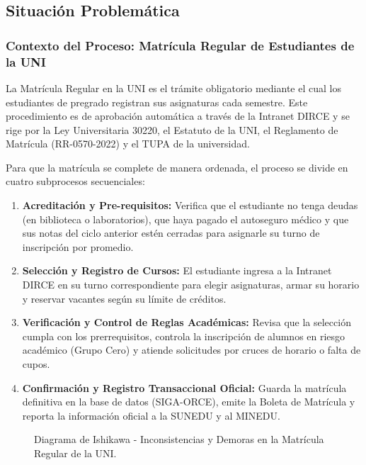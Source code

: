 \subsection{Situación Problemática}

\subsubsection{Contexto del Proceso: Matrícula Regular de Estudiantes de la UNI}
La Matrícula Regular en la UNI es el trámite obligatorio mediante el cual los estudiantes de pregrado registran sus asignaturas cada semestre. Este procedimiento es de aprobación automática a través de la Intranet DIRCE y se rige por la Ley Universitaria 30220, el Estatuto de la UNI, el Reglamento de Matrícula (RR-0570-2022) y el TUPA de la universidad.

Para que la matrícula se complete de manera ordenada, el proceso se divide en cuatro subprocesos secuenciales:
\begin{enumerate}
\item \textbf{Acreditación y Pre-requisitos:} Verifica que el estudiante no tenga deudas (en biblioteca o laboratorios), que haya pagado el autoseguro médico y que sus notas del ciclo anterior estén cerradas para asignarle su turno de inscripción por promedio.
\item \textbf{Selección y Registro de Cursos:} El estudiante ingresa a la Intranet DIRCE en su turno correspondiente para elegir asignaturas, armar su horario y reservar vacantes según su límite de créditos.
\item \textbf{Verificación y Control de Reglas Académicas:} Revisa que la selección cumpla con los prerrequisitos, controla la inscripción de alumnos en riesgo académico (Grupo Cero) y atiende solicitudes por cruces de horario o falta de cupos.
\item \textbf{Confirmación y Registro Transaccional Oficial:} Guarda la matrícula definitiva en la base de datos (SIGA-ORCE), emite la Boleta de Matrícula y reporta la información oficial a la SUNEDU y al MINEDU.
\end{enumerate}

\vspace{1cm}

\begin{figure}[H]
\centering
\resizebox{\textwidth}{!}{%
     
}
\caption{Diagrama de Ishikawa - Inconsistencias y Demoras en la Matrícula Regular de la UNI.}
\label{fig:ishikawa}
\end{figure}

